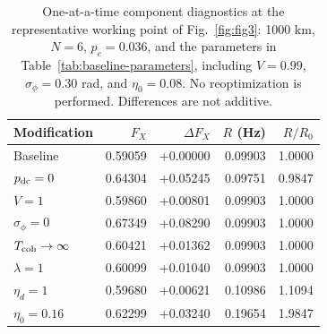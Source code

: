 \begin{table}[tbp]
\caption{\label{tab:component-sensitivity}One-at-a-time component diagnostics at the representative working point of Fig.~\ref{fig:fig3}: 1000 km, $N=6$, $p_e=0.036$, and the parameters in Table~\ref{tab:baseline-parameters}, including $V=0.99$, $\sigma_\phi=0.30$ rad, and $\eta_0=0.08$. No reoptimization is performed. Differences are not additive.}
\begin{ruledtabular}
\begin{tabular}{lrrrr}
Modification & $F_X$ & $\Delta F_X$ & $R$ (Hz) & $R/R_0$\\
\hline
Baseline & 0.59059 & +0.00000 & 0.09903 & 1.0000\\
$p_{\rm dc}=0$ & 0.64304 & +0.05245 & 0.09751 & 0.9847\\
$V=1$ & 0.59860 & +0.00801 & 0.09903 & 1.0000\\
$\sigma_\phi=0$ & 0.67349 & +0.08290 & 0.09903 & 1.0000\\
$T_{\rm coh}\to\infty$ & 0.60421 & +0.01362 & 0.09903 & 1.0000\\
$\lambda=1$ & 0.60099 & +0.01040 & 0.09903 & 1.0000\\
$\eta_d=1$ & 0.59680 & +0.00621 & 0.10986 & 1.1094\\
$\eta_0=0.16$ & 0.62299 & +0.03240 & 0.19654 & 1.9847\\
\end{tabular}
\end{ruledtabular}
\end{table}
